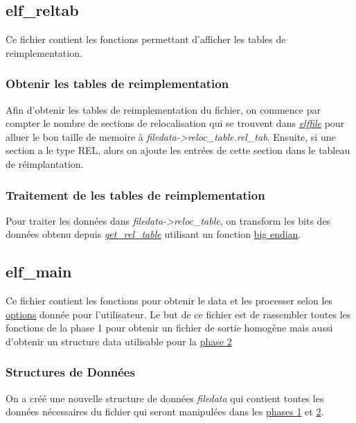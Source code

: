\documentclass[a4paper]{article} %
\begin{document}

\subsection{elf\_reltab}
\label{sec:relocation}
\noindent Ce fichier contient les fonctions permettant d'afficher les tables de 
reimplementation.

\subsubsection*{Obtenir les tables de reimplementation}
\label{sec:getreltab}
Afin d'obtenir les tables de reimplementation du fichier, on commence par compter 
le nombre de sections de relocalisation qui se trouvent dans \hyperref[sec:elffile]{\textit{elffile}} pour alluer 
le bon taille de memoire à \textit{filedata->reloc\_table.rel\_tab}. Ensuite, si une 
section a le type REL, alors on ajoute les entrées de cette section dans le tableau de 
réimplantation.

\subsubsection*{Traitement de les tables de reimplementation}
Pour traiter les données dans \textit{filedata->reloc\_table}, on transform 
les bits des données obtenu depuis \hyperref[sec:getreltab]{\textit{get\_rel\_table}}
utilisant un fonction \hyperref[sec:endian]{big endian}. 


\subsection{elf\_main}
\noindent Ce fichier contient les fonctions pour obtenir le data et les processer 
selon les \hyperref[sec:options]{options} donnée pour l'utilisateur. Le but de ce 
fichier est de rassembler toutes les fonctions de la phase 1 pour obtenir un fichier 
de sortie homogène mais aussi d'obtenir un structure data utilisable pour la 
\hyperref[sec:phase2]{phase 2} 

\subsubsection*{Structures de Données}
\label{sec:filedata}

On a créé une nouvelle structure de données \textit{filedata} qui contient 
toutes les données nécessaires du fichier qui seront manipulées dans les \hyperref[sec:phase1]{phases 1} 
et \hyperref[sec:phase2]{2}. 
\end{document}
